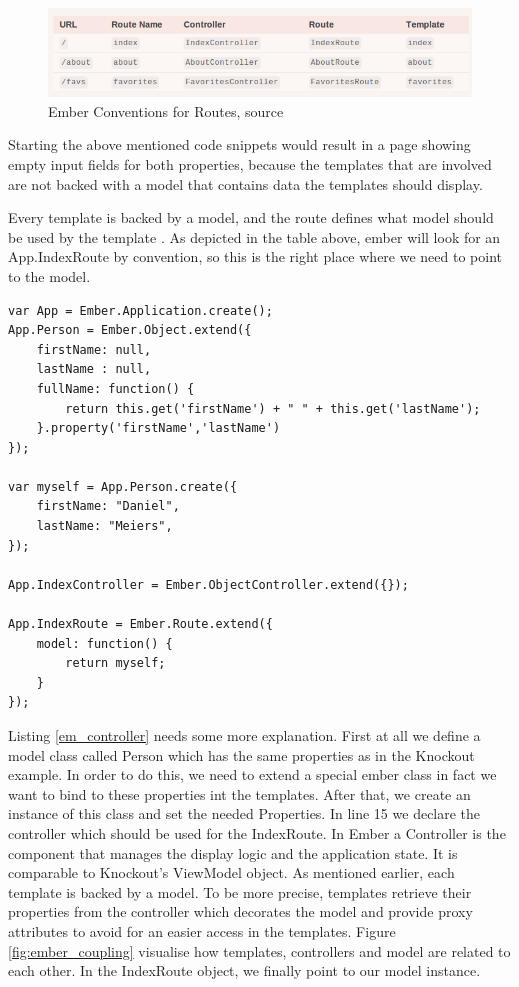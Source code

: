 \begin{figure}
	\centering	\includegraphics[width=1.0\textwidth]{./img/tech-ana/ember_routes_conventions.png}
	\caption{Ember Conventions for Routes, source \autocite{tech-ana:em-routes-coc}}
	\label{fig:ember_routes}
\end{figure}

Starting the above mentioned code snippets would result in a page showing empty input fields for both properties, because the templates that are involved are not backed with a model that contains data the templates should display.

Every template is backed by a model, and the route defines what model should be used by the template .
As depicted in the table above, ember will look for an App.IndexRoute by convention, so this is the right place where we need to point to the model.

\begin{lstlisting}[label=em_controller,caption=app.js]
var App = Ember.Application.create();
App.Person = Ember.Object.extend({
	firstName: null,
	lastName : null,
    fullName: function() {
        return this.get('firstName') + " " + this.get('lastName');
    }.property('firstName','lastName')
});

var myself = App.Person.create({
    firstName: "Daniel",
    lastName: "Meiers",
});

App.IndexController = Ember.ObjectController.extend({});

App.IndexRoute = Ember.Route.extend({
    model: function() {
        return myself;
    }
});
\end{lstlisting}

Listing \ref{em_controller} needs some more explanation.
First at all we define a model class called Person which has the same properties as in the Knockout example.
In order to do this, we need to extend a special ember class in fact we want to bind to these properties int the templates.
After that, we create an instance of this class and set the needed Properties.
In line 15 we declare the controller which should be used for the IndexRoute.
In Ember a Controller is the component that manages the display logic and the application state.
It is comparable to Knockout's ViewModel object.
As mentioned earlier, each template is backed by a model.
To be more precise, templates retrieve their properties from the controller which decorates the model and provide proxy attributes to avoid for an easier access in the templates. Figure \ref{fig:ember_coupling} visualise how templates, controllers and model are related to each other.
In the IndexRoute object, we finally point to our model instance.

